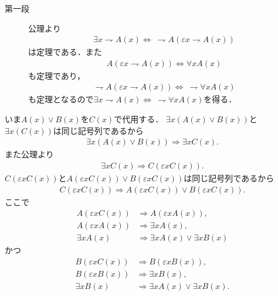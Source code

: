 	\begin{prf}\mbox{}
		\begin{description}
			\item[第一段]
				公理より
				\begin{align}
					\exists x \rightharpoondown A(x) \Longleftrightarrow\ 
					\rightharpoondown A(\varepsilon x \rightharpoondown A(x))
				\end{align}
				は定理である．また
				\begin{align}
					A(\varepsilon x \rightharpoondown A(x)) \Longleftrightarrow \forall x A(x) 
				\end{align}
				も定理であり，
				\begin{align}
					\rightharpoondown A(\varepsilon x \rightharpoondown A(x)) \Longleftrightarrow\ 
					\rightharpoondown \forall x A(x)
				\end{align}
				も定理となるので$\exists x \rightharpoondown A(x) \Longleftrightarrow\ \rightharpoondown \forall x A(x)$を得る．
		\end{description}
		いま$A(x) \vee B(x)$を$C(x)$で代用する．
		$\exists x ( A(x) \vee B(x) )$と$\exists x ( C(x) )$は同じ記号列であるから
		\begin{align}
			\exists x ( A(x) \vee B(x) ) \Longrightarrow \exists x C(x).
		\end{align}
		また公理より
		\begin{align}
			\exists x C(x) \Longrightarrow C(\varepsilon x C(x)).
		\end{align}
		$C(\varepsilon x C(x))$と$A(\varepsilon x C(x)) \vee B(\varepsilon x C(x))$は同じ記号列であるから
		\begin{align}
			C(\varepsilon x C(x)) \Longrightarrow A(\varepsilon x C(x)) \vee B(\varepsilon x C(x)).
		\end{align}
		ここで
		\begin{align}
			A(\varepsilon x C(x)) &\Longrightarrow A(\varepsilon x A(x)), \\
			A(\varepsilon x A(x)) &\Longrightarrow \exists x A(x), \\
			\exists x A(x) &\Longrightarrow \exists x A(x) \vee \exists x B(x)
		\end{align}
		かつ
		\begin{align}
			B(\varepsilon x C(x)) &\Longrightarrow B(\varepsilon x B(x)), \\
			B(\varepsilon x B(x)) &\Longrightarrow \exists x B(x), \\
			\exists x B(x) &\Longrightarrow \exists x A(x) \vee \exists x B(x).
		\end{align}

\end{prf}
